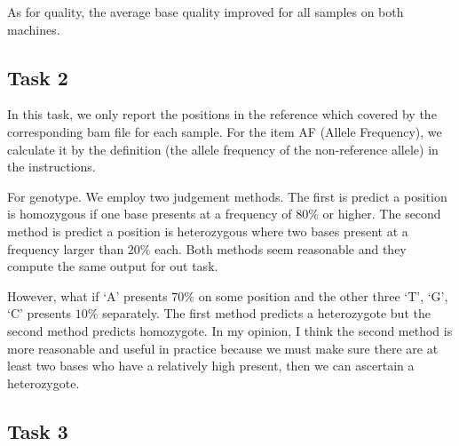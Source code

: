 \documentclass[a4paper]{article}
\begin{document}
As for quality, the average base quality improved for all samples on both machines.


\subsection{Task 2}

In this task, we only report the positions in the reference which covered by the corresponding bam file for each sample. For the item AF (Allele Frequency), we calculate it by the definition (the allele frequency of the non-reference allele) in the instructions. 

For genotype. We employ two judgement methods. The first is predict a position is  homozygous if one base presents at a frequency of $80\%$ or higher. The second method is predict a position is heterozygous where two bases present at a frequency larger than $20\%$ each. Both methods seem reasonable and they compute the same output for out task.

 However, what if `A' presents $70\%$ on some position and the other three `T', `G', `C' presents $10\%$ separately. The first method predicts a heterozygote but the second method predicts homozygote. In my opinion, I think the second method is more reasonable and useful in practice because we must make sure there are at least two bases who have a relatively high present, then we can ascertain a heterozygote.

\subsection{Task 3}
\end{document}
